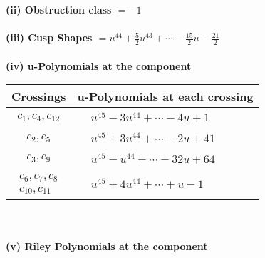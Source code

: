 \documentclass[1p]{elsarticle_modified}
\theoremstyle{definition}
\begin{document}
\flushleft \textbf{(ii) Obstruction class $= -1$}\\~\\
\flushleft \textbf{(iii) Cusp Shapes $= u^{44}+\frac{5}{2} u^{43}+\cdots-\frac{15}{2} u-\frac{21}{2}$}\\~\\
\newpage\renewcommand{\arraystretch}{1}
\flushleft \textbf{(iv) u-Polynomials at the component}\newline \\
\begin{tabular}{m{50pt}|m{274pt}}
Crossings & \hspace{64pt}u-Polynomials at each crossing \\
\hline $$\begin{aligned}c_{1},c_{4},c_{12}\end{aligned}$$&$\begin{aligned}
&u^{45}-3 u^{44}+\cdots-4 u+1
\end{aligned}$\\
\hline $$\begin{aligned}c_{2},c_{5}\end{aligned}$$&$\begin{aligned}
&u^{45}+3 u^{44}+\cdots-2 u+41
\end{aligned}$\\
\hline $$\begin{aligned}c_{3},c_{9}\end{aligned}$$&$\begin{aligned}
&u^{45}- u^{44}+\cdots-32 u+64
\end{aligned}$\\
\hline $$\begin{aligned}c_{6},c_{7},c_{8}\\c_{10},c_{11}\end{aligned}$$&$\begin{aligned}
&u^{45}+4 u^{44}+\cdots+u-1
\end{aligned}$\\
\hline
\end{tabular}\\~\\
\newpage\renewcommand{\arraystretch}{1}
\flushleft \textbf{(v) Riley Polynomials at the component}\newline \\
\end{document}
